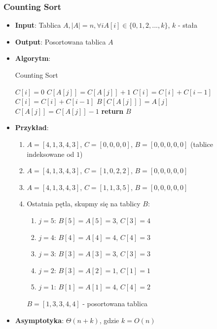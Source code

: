 \documentclass[11pt,a4paper]{article}
\begin{document}
\subsubsection{Counting Sort}
\begin{itemize}
    \item \textbf{Input}: Tablica $A, |A|=n, \forall i A[i] \in \{0,1,2,...,k\}$, $k$ - stała
    \item \textbf{Output}: Posortowana tablica $A$
    \item \textbf{Algorytm}:
        \begin{algorithm}
            \caption{Counting Sort}
            \begin{algorithmic}[1]
                 
                    \State $C[i] = 0$
                \EndFor
                 
                    \State $C[A[j]] = C[A[j]] + 1$
                \EndFor
                 
                    \State $C[i] = C[i] + C[i-1]$
                \State $C[i] = C[i] + C[i-1]$ 
                \EndFor
                 
                    \State $B[C[A[j]]] = A[j]$
                    \State $C[A[j]] = C[A[j]] - 1$
                \EndFor
                \State \textbf{return} $B$ 
                \EndProcedure
            \end{algorithmic}
        \end{algorithm}
    \item \textbf{Przykład}:
        \begin{enumerate}
            \item $A = [4,1,3,4,3]$, $C=[0,0,0,0]$, $B=[0,0,0,0,0]$ (tablice indeksowane od $1$)
            \item $A = [4,1,3,4,3]$, $C=[1,0,2,2]$, $B=[0,0,0,0,0]$
            \item $A = [4,1,3,4,3]$, $C=[1,1,3,5]$, $B=[0,0,0,0,0]$
            \item Ostatnia pętla, skupmy się na tablicy $B$:
                \begin{enumerate}
                    \item $j = 5$: $B[5] = A[5] = 3$, $C[3] = 4$
                    \item $j = 4$: $B[4] = A[4] = 4$, $C[4] = 3$
                    \item $j = 3$: $B[3] = A[3] = 3$, $C[3] = 3$
                    \item $j = 2$: $B[3] = A[2] = 1$, $C[1] = 1$
                    \item $j = 1$: $B[1] = A[1] = 4$, $C[4] = 2$
                \end{enumerate}
                $B = [1,3,3,4,4]$ - posortowana tablica
        \end{enumerate}
    \item \textbf{Asymptotyka}: $\Theta(n+k)$, gdzie $k = O(n)$
\end{itemize}
\end{document}
